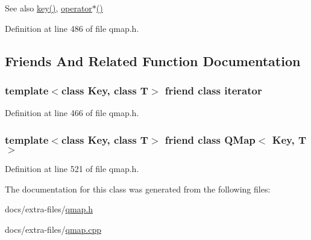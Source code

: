 \begin{DoxySeeAlso}{See also}
\hyperlink{class_q_map_1_1const__iterator_a130e2c00e2ab88936f643ec613e19b51}{key()}, \hyperlink{class_q_map_1_1const__iterator_ae076d536c6747db859fee27cdb5f8f02}{operator$\ast$()} 
\end{DoxySeeAlso}


Definition at line 486 of file qmap.\+h.



\subsection{Friends And Related Function Documentation}
\subsubsection[{\texorpdfstring{iterator}{iterator}}]{\setlength{\rightskip}{0pt plus 5cm}template$<$class Key, class T$>$ friend class {\bf iterator}\hspace{0.3cm}{\ttfamily [friend]}}\hypertarget{class_q_map_1_1const__iterator_a67171474c4da6cc8efe0c7fafefd2b2d}{}\label{class_q_map_1_1const__iterator_a67171474c4da6cc8efe0c7fafefd2b2d}


Definition at line 466 of file qmap.\+h.

\subsubsection[{\texorpdfstring{Q\+Map$<$ Key, T $>$}{QMap< Key, T >}}]{\setlength{\rightskip}{0pt plus 5cm}template$<$class Key, class T$>$ friend class {\bf Q\+Map}$<$ Key, T $>$\hspace{0.3cm}{\ttfamily [friend]}}\hypertarget{class_q_map_1_1const__iterator_a6f07e70412dd8d995969c9e0cb5bc4a0}{}\label{class_q_map_1_1const__iterator_a6f07e70412dd8d995969c9e0cb5bc4a0}


Definition at line 521 of file qmap.\+h.



The documentation for this class was generated from the following files\+:\begin{DoxyCompactItemize}
\item 
docs/extra-\/files/\hyperlink{qmap_8h}{qmap.\+h}\item 
docs/extra-\/files/\hyperlink{qmap_8cpp}{qmap.\+cpp}\end{DoxyCompactItemize}
